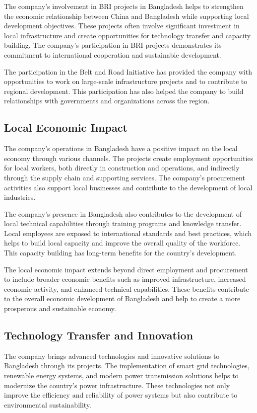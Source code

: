 The company's involvement in BRI projects in Bangladesh helps to strengthen the economic relationship between China and Bangladesh while supporting local development objectives. These projects often involve significant investment in local infrastructure and create opportunities for technology transfer and capacity building. The company's participation in BRI projects demonstrates its commitment to international cooperation and sustainable development.

The participation in the Belt and Road Initiative has provided the company with opportunities to work on large-scale infrastructure projects and to contribute to regional development. This participation has also helped the company to build relationships with governments and organizations across the region.

\subsection{Local Economic Impact}
The company's operations in Bangladesh have a positive impact on the local economy through various channels. The projects create employment opportunities for local workers, both directly in construction and operations, and indirectly through the supply chain and supporting services. The company's procurement activities also support local businesses and contribute to the development of local industries.

The company's presence in Bangladesh also contributes to the development of local technical capabilities through training programs and knowledge transfer. Local employees are exposed to international standards and best practices, which helps to build local capacity and improve the overall quality of the workforce. This capacity building has long-term benefits for the country's development.

The local economic impact extends beyond direct employment and procurement to include broader economic benefits such as improved infrastructure, increased economic activity, and enhanced technical capabilities. These benefits contribute to the overall economic development of Bangladesh and help to create a more prosperous and sustainable economy.

\subsection{Technology Transfer and Innovation}
The company brings advanced technologies and innovative solutions to Bangladesh through its projects. The implementation of smart grid technologies, renewable energy systems, and modern power transmission solutions helps to modernize the country's power infrastructure. These technologies not only improve the efficiency and reliability of power systems but also contribute to environmental sustainability.

